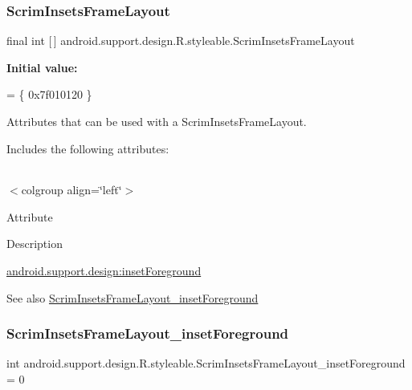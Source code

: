 \subsubsection{\texorpdfstring{Scrim\+Insets\+Frame\+Layout}{ScrimInsetsFrameLayout}}
{\footnotesize\ttfamily final int \mbox{[}$\,$\mbox{]} android.\+support.\+design.\+R.\+styleable.\+Scrim\+Insets\+Frame\+Layout\hspace{0.3cm}{\ttfamily [static]}}

{\bfseries Initial value\+:}
\begin{DoxyCode}
= \{
            0x7f010120
        \}
\end{DoxyCode}
Attributes that can be used with a Scrim\+Insets\+Frame\+Layout. 

Includes the following attributes\+:

\tabulinesep=1mm
\begin{longtabu} spread 0pt [c]{*{0}{|X[-1]}|}
\hline
\end{longtabu}
$<$colgroup align=\char`\"{}left\char`\"{}$>$ 

Attribute

Description 

{\ttfamily \hyperlink{classandroid_1_1support_1_1design_1_1R_1_1styleable_a3a7ff73bbc7b3aeb5439022d90d08790}{android.\+support.\+design\+:inset\+Foreground}}

\begin{DoxySeeAlso}{See also}
\hyperlink{classandroid_1_1support_1_1design_1_1R_1_1styleable_a3a7ff73bbc7b3aeb5439022d90d08790}{Scrim\+Insets\+Frame\+Layout\+\_\+inset\+Foreground} 
\end{DoxySeeAlso}
\mbox{\label{classandroid_1_1support_1_1design_1_1R_1_1styleable_a3a7ff73bbc7b3aeb5439022d90d08790}} 
\subsubsection{\texorpdfstring{Scrim\+Insets\+Frame\+Layout\+\_\+inset\+Foreground}{ScrimInsetsFrameLayout\_insetForeground}}
{\footnotesize\ttfamily int android.\+support.\+design.\+R.\+styleable.\+Scrim\+Insets\+Frame\+Layout\+\_\+inset\+Foreground = 0\hspace{0.3cm}{\ttfamily [static]}}

